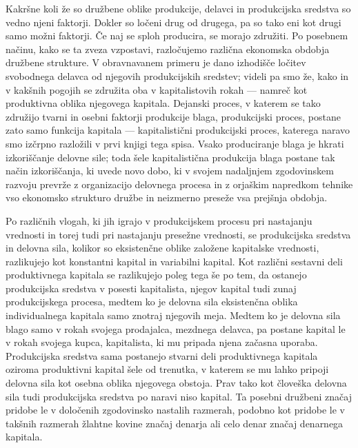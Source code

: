 \documentclass[kapital_02.tex]{subfiles}
\begin{document}
Kakršne koli že so družbene oblike produkcije, delavci in produkcijska sredstva so vedno njeni faktorji. Dokler so ločeni drug od drugega, pa so tako eni kot drugi samo možni faktorji. Če naj se sploh producira, se morajo združiti. Po posebnem načinu, kako se ta zveza vzpostavi, razločujemo različna ekonomska obdobja družbene strukture. V obravnavanem primeru je dano izhodišče ločitev svobodnega delavca od njegovih produkcijskih sredstev; videli pa smo že, kako in v kakšnih pogojih se združita oba v kapitalistovih rokah --- namreč kot produktivna oblika njegovega kapitala. Dejanski proces, v katerem se tako združijo tvarni in osebni faktorji produkcije blaga, produkcijski proces, postane zato samo funkcija kapitala --- kapitalistični produkcijski proces, katerega naravo smo izčrpno razložili v prvi knjigi tega spisa. Vsako produciranje blaga je hkrati izkoriščanje delovne sile; toda šele kapitalistična produkcija blaga postane tak način izkoriščanja, ki uvede novo dobo, ki v svojem nadaljnjem zgodovinskem razvoju prevrže z organizacijo delovnega procesa in z orjaškim napredkom tehnike vso ekonomsko strukturo družbe in neizmerno preseže vsa prejšnja obdobja.

Po različnih vlogah, ki jih igrajo v produkcijskem procesu pri nastajanju vrednosti in torej tudi pri nastajanju presežne vrednosti, se produkcijska sredstva in delovna sila, kolikor so eksistenčne oblike založene kapitalske vrednosti, razlikujejo kot konstantni kapital in variabilni kapital. Kot različni sestavni deli produktivnega kapitala se razlikujejo poleg tega še po tem, da ostanejo produkcijska sredstva v posesti kapitalista, njegov kapital tudi zunaj produkcijskega procesa, medtem ko je delovna sila eksistenčna oblika individualnega kapitala samo znotraj njegovih meja. Medtem ko je delovna sila blago samo v rokah svojega prodajalca, mezdnega delavca, pa postane kapital le v rokah svojega kupca, kapitalista, ki mu pripada njena začasna uporaba. Produkcijska sredstva sama postanejo stvarni deli produktivnega kapitala oziroma produktivni kapital šele od trenutka, v katerem se mu lahko pripoji delovna sila kot osebna oblika njegovega obstoja. Prav tako kot človeška delovna sila tudi produkcijska sredstva po naravi niso kapital. Ta posebni družbeni značaj pridobe le v določenih zgodovinsko nastalih razmerah, podobno kot pridobe le v takšnih razmerah žlahtne kovine značaj denarja ali celo denar značaj denarnega kapitala.
\end{document}
